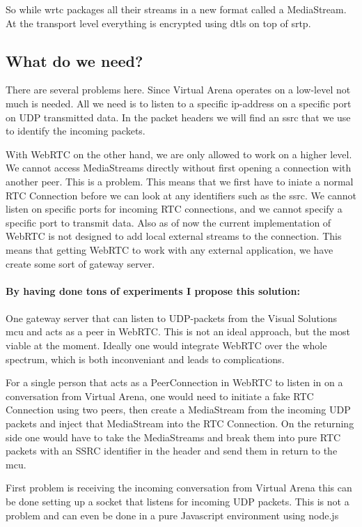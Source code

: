 So while \gls{wrtc} packages all their streams in a new format called a MediaStream. At the transport level everything is encrypted using \gls{dtls} on top of \gls{srtp}.

\subsection{What do we need?}
There are several problems here. Since Virtual Arena operates on a low-level not much is needed. All we need is to listen to a specific ip-address on a specific port on UDP transmitted data. In the packet headers we will find an \gls{ssrc} that we use to identify the incoming packets.

With WebRTC on the other hand, we are only allowed to work on a higher level. We cannot access MediaStreams directly without first opening a connection with another peer. This is a problem. This means that we first have to iniate a normal RTC Connection before we can look at any identifiers such as the \gls{ssrc}. We cannot listen on specific ports for incoming RTC connections, and we cannot specify a specific port to transmit data. Also as of now the current implementation of WebRTC is not designed to add local external streams to the connection. This means that getting WebRTC to work with any external application, we have create some sort of gateway server.
\\
\\
\textbf{By having done tons of experiments I propose this solution:}
\\
\\
One gateway server that can listen to UDP-packets from the Visual Solutions \gls{mcu} and acts as a peer in WebRTC. This is not an ideal approach, but the most viable at the moment. Ideally one would integrate WebRTC over the whole spectrum, which is both inconveniant and leads to complications.

For a single person that acts as a PeerConnection in WebRTC to listen in on a conversation from Virtual Arena, one would need to initiate a fake RTC Connection using two peers, then create a MediaStream from the incoming UDP packets and inject that MediaStream into the RTC Connection. On the returning side one would have to take the MediaStreams and break them into pure RTC packets with an SSRC identifier in the header and send them in return to the \gls{mcu}.

First problem is receiving the incoming conversation from Virtual Arena this can be done setting up a socket that listens for incoming UDP packets. This is not a problem and can even be done in a pure Javascript environment using node.js

